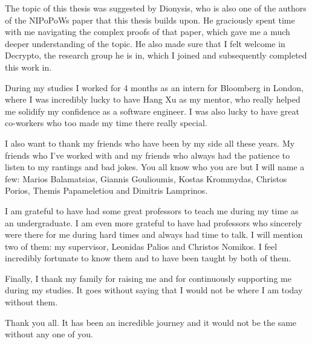 \documentclass{report}
\begin{document}
The topic of this thesis was suggested by Dionysis, who is also one of the authors of the NIPoPoWs paper that this thesis builds upon. He graciously spent time with me navigating the complex proofs of that paper, which gave me a much deeper understanding of the topic. He also made sure that I felt welcome in Decrypto, the research group he is in, which I joined and subsequently completed this work in.

During my studies I worked for 4 months as an intern for Bloomberg in London, where I was incredibly lucky to have Hang Xu as my mentor, who really helped me solidify my confidence as a software engineer. I was also lucky to have great co-workers who too made my time there really special.

I also want to thank my friends who have been by my side all these years. My friends who I've worked with and my friends who always had the patience to listen to my rantings and bad jokes. You all know who you are but I will name a few: Marios Balamatsias, Giannis Goulioumis, Kostas Krommydas, Christos Porios, Themis Papameletiou and Dimitris Lamprinos.

I am grateful to have had some great professors to teach me during my time as an undergraduate. I am even more grateful to have had professors who sincerely were there for me during hard times and always had time to talk. I will mention two of them: my supervisor, Leonidas Palios and Christos Nomikos. I feel incredibly fortunate to know them and to have been taught by both of them.

Finally, I thank my family for raising me and for continuously supporting me during my studies. It goes without saying that I would not be where I am today without them.

Thank you all. It has been an incredible journey and it would not be the same without any one of you.
\else
\fi

\thispagestyle{empty}
\newpage

\tableofcontents
\thispagestyle{empty}
\newpage
\setcounter{page}{1}








\end{document}
